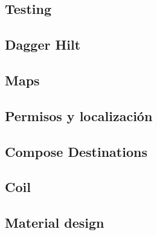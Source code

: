 \subsection{Testing}

\subsection{Dagger Hilt}

\subsection{Maps}

\subsection{Permisos y localización}

\subsection{Compose Destinations}

\subsection{Coil}

\subsection{Material design}
